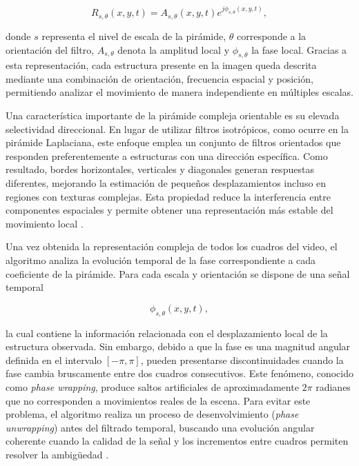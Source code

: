\begin{equation}
R_{s,\theta}(x,y,t)
=
A_{s,\theta}(x,y,t)
e^{j\phi_{s,\theta}(x,y,t)},
\label{eq:steerable}
\end{equation}

donde $s$ representa el nivel de escala de la pirámide, $\theta$ corresponde a la orientación del filtro, $A_{s,\theta}$ denota la amplitud local y $\phi_{s,\theta}$ la fase local. Gracias a esta representación, cada estructura presente en la imagen queda descrita mediante una combinación de orientación, frecuencia espacial y posición, permitiendo analizar el movimiento de manera independiente en múltiples escalas.

Una característica importante de la pirámide compleja orientable es su elevada selectividad direccional. En lugar de utilizar filtros isotrópicos, como ocurre en la pirámide Laplaciana, este enfoque emplea un conjunto de filtros orientados que responden preferentemente a estructuras con una dirección específica. Como resultado, bordes horizontales, verticales y diagonales generan respuestas diferentes, mejorando la estimación de pequeños desplazamientos incluso en regiones con texturas complejas. Esta propiedad reduce la interferencia entre componentes espaciales y permite obtener una representación más estable del movimiento local \cite{wadhwa2013phase}.

Una vez obtenida la representación compleja de todos los cuadros del video, el algoritmo analiza la evolución temporal de la fase correspondiente a cada coeficiente de la pirámide. Para cada escala y orientación se dispone de una señal temporal

\begin{equation}
\phi_{s,\theta}(x,y,t),
\end{equation}

la cual contiene la información relacionada con el desplazamiento local de la estructura observada. Sin embargo, debido a que la fase es una magnitud angular definida en el intervalo $[-\pi,\pi]$, pueden presentarse discontinuidades cuando la fase cambia bruscamente entre dos cuadros consecutivos. Este fenómeno, conocido como \textit{phase wrapping}, produce saltos artificiales de aproximadamente $2\pi$ radianes que no corresponden a movimientos reales de la escena. Para evitar este problema, el algoritmo realiza un proceso de desenvolvimiento (\textit{phase unwrapping}) antes del filtrado temporal, buscando una evolución angular coherente cuando la calidad de la señal y los incrementos entre cuadros permiten resolver la ambigüedad \cite{wadhwa2013phase}.

